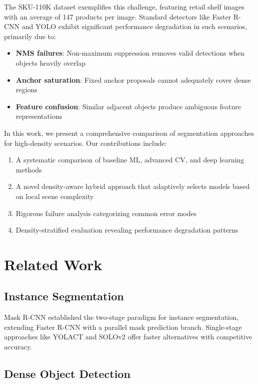\documentclass[conference]{IEEEtran}
\begin{document}
The SKU-110K dataset \cite{goldman2019precise} exemplifies this challenge, featuring retail shelf images with an average of 147 products per image. Standard detectors like Faster R-CNN and YOLO exhibit significant performance degradation in such scenarios, primarily due to:

\begin{itemize}
    \item \textbf{NMS failures}: Non-maximum suppression removes valid detections when objects heavily overlap
    \item \textbf{Anchor saturation}: Fixed anchor proposals cannot adequately cover dense regions
    \item \textbf{Feature confusion}: Similar adjacent objects produce ambiguous feature representations
\end{itemize}

In this work, we present a comprehensive comparison of segmentation approaches for high-density scenarios. Our contributions include:

\begin{enumerate}
    \item A systematic comparison of baseline ML, advanced CV, and deep learning methods
    \item A novel density-aware hybrid approach that adaptively selects models based on local scene complexity
    \item Rigorous failure analysis categorizing common error modes
    \item Density-stratified evaluation revealing performance degradation patterns
\end{enumerate}

\section{Related Work}

\subsection{Instance Segmentation}

Mask R-CNN \cite{he2017mask} established the two-stage paradigm for instance segmentation, extending Faster R-CNN with a parallel mask prediction branch. Single-stage approaches like YOLACT \cite{bolya2019yolact} and SOLOv2 \cite{wang2020solov2} offer faster alternatives with competitive accuracy.

\subsection{Dense Object Detection}
\end{document}
